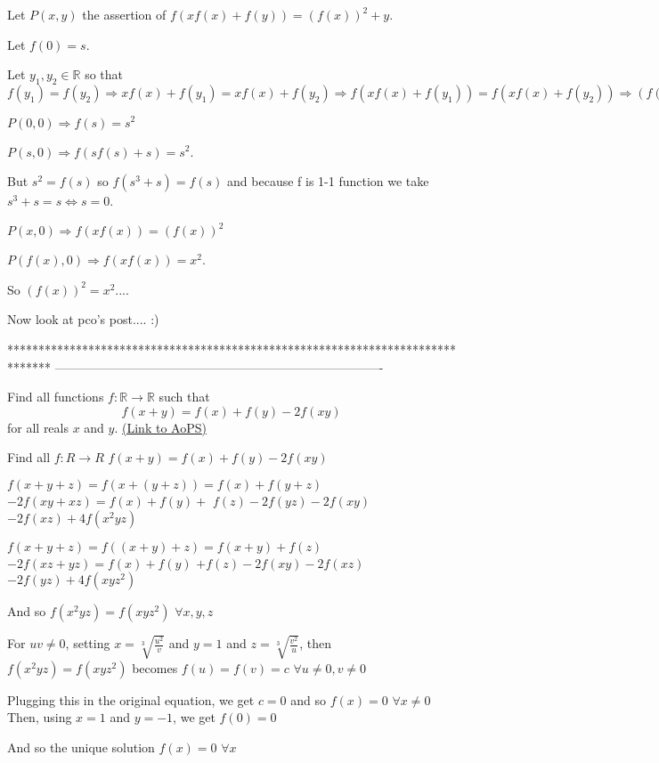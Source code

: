 \begin{solution}
	Let $ P(x,y)$ the assertion of $ f(xf(x)+f(y))=(f(x))^2+y$.

Let $ f(0)=s$.

Let $ y_1,y_2 \in \mathbb{R}$ so that 
$ f(y_1)=f(y_2) \Longrightarrow xf(x)+f(y_1)=xf(x)+f(y_2) \Longrightarrow f(xf(x)+f(y_1))=f(xf(x)+f(y_2)) \Longrightarrow (f(x))^2+y_1=(f(x))^2+y_2 \Longrightarrow y_1=y_2$

$ P(0,0) \Longrightarrow f(s)=s^2$


$ P(s,0) \Longrightarrow f(sf(s)+s)= s^2$.

But $ s^2=f(s)$ so 
$ f(s^3+s)=f(s)$ and because f is 1-1 function we take $ s^3+s=s \Longleftrightarrow s=0$.

$ P(x,0) \Longrightarrow f(xf(x))=(f(x))^2$

$ P(f(x),0) \Longrightarrow f(xf(x))=x^2$.

So $ (f(x))^2=x^2$....

Now look at pco's post.... :)
\end{solution}
*******************************************************************************
-------------------------------------------------------------------------------

\begin{problem}
	Find all functions $f: \mathbb R \to \mathbb R$ such that
\[ f(x+y)=f(x)+f(y)-2f(xy)\]
for all reals $x$ and $y$.
	\flushright \href{https://artofproblemsolving.com/community/c6h314018}{(Link to AoPS)}
\end{problem}



\begin{solution}
	\begin{tcolorbox}Find all  $ f : R \rightarrow R$
 $ f(x + y) = f(x) + f(y) - 2f(xy)$\end{tcolorbox}

$ f(x + y + z) = f(x + (y + z)) = f(x) + f(y + z)$ $ - 2f(xy + xz) = f(x) + f(y) +$ $ f(z) - 2f(yz) - 2f(xy)$ $ - 2f(xz) + 4f(x^2yz)$

$ f(x + y + z) = f((x + y) + z) = f(x + y) + f(z)$ $ - 2f(xz + yz) = f(x) + f(y)$ $ + f(z) - 2f(xy) - 2f(xz)$ $ - 2f(yz) + 4f(xyz^2)$

And so $ f(x^2yz) = f(xyz^2)$ $ \forall x,y,z$

For $ uv\ne 0$, setting $ x = \sqrt [3]{\frac {u^2}v}$ and $ y = 1$ and $ z = \sqrt [3]{\frac {v^2}u}$, then $ f(x^2yz) = f(xyz^2)$ becomes $ f(u) = f(v) = c$ $ \forall u\ne 0,v\ne0$

Plugging this in the original equation, we get $ c =0$ and so $ f(x) = 0$ $ \forall x\ne 0$
Then, using $ x = 1$ and $ y = - 1$, we get $ f(0) = 0$

And so the unique solution $ f(x) = 0$ $ \forall x$
\end{solution}



